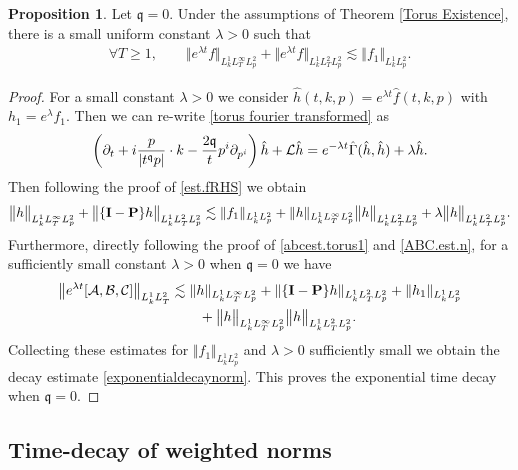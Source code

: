 \documentclass[reqno]{amsart}
\newcommand{\pv}{p}
\def\norm#1{\big\Vert#1\big\Vert}
\newcommand{\qq}{\mathfrak{q}}
\newcommand{\tq}{t^{\qq}}
\newcommand{\linL}{\mathcal{L}}
\newcommand{\micro}{{\bf \{I- P\}}}
\theoremstyle{definition}
\newtheorem{proposition}[theorem]{Proposition}
\numberwithin{equation}{section}
\numberwithin{theorem}{section}
\begin{document}
\begin{proposition}
    Let \(\qq=0\). Under the assumptions of Theorem \ref{Torus Existence}, there is a small uniform constant \(\lambda>0\) such that
    \begin{align}
    \forall T \geq 1,\qquad \norm{e^{\lambda t} f}_{L^1_kL^\infty_TL^2_{\pv}}
+
{\norm{e^{\lambda t} f}_{L^1_kL^2_TL^2_{\pv}}}
\lesssim 
\Vert {f}_1\Vert_{L^1_kL^2_{\pv}}.\label{exponentialdecaynorm}
\end{align}
\end{proposition}

\begin{proof}
For a small constant $\lambda>0$ we consider $\hat{h}(t,k,\pv) = e^{\lambda t} \hat{f}(t,k,\pv)$ with ${h}_1=e^{\lambda}{f}_1$.  Then we can re-write \eqref{torus fourier transformed} as
\begin{align}\notag 
\left(\partial_t  + i\frac{\pv}{|\tq \pv|}\cdot k 
-\frac{2\qq }{t} p^i \partial_{p^i} \right) \hat{h}
+\linL\hat{h}=e^{-\lambda t}\hat{\Gamma}(\hat{h},\hat{h})+ \lambda \hat{h}.
\end{align}
Then following the proof of \eqref{est.fRHS} we obtain
\begin{align*}
    \norm{h}_{L^1_kL^\infty_TL^2_{\pv}}
+
{\norm{\micro h}_{L^1_kL^2_TL^2_{\pv}}}
\lesssim 
\Vert {f}_1\Vert_{L^1_kL^2_{\pv}}
+{\Vert{ h}\Vert_{L^1_kL^\infty_TL^2_{\pv}}} {\norm{ h}_{L^1_kL^2_TL^2_{\pv}}}
+\lambda {\norm{ h}_{L^1_kL^2_TL^2_{\pv}}}.
\end{align*}
Furthermore, directly following the proof of \eqref{abcest.torus1} and \eqref{ABC.est.n}, for a sufficiently small constant $\lambda>0$ when $\qq =0$ we have 
\begin{align}\notag
\norm{ e^{\lambda t} [\mathcal{A},\mathcal{B},\mathcal{C}]}_{L^1_k L^2_T} 
&\lesssim
\Vert h \Vert_{L^1_k L^\infty_T L^2_{\pv}} +
\Vert \micro h \Vert_{L^1_k L^2_T L^2_{\pv}} + \Vert h_1 \Vert_{L^1_k L^2_{\pv}} \\ \notag
&\qquad+ 
    \norm{h}_{L^1_kL^\infty_TL^2_{\pv}} \norm{h}_{L^1_kL^2_TL^2_{\pv}}.
\end{align}
Collecting these estimates for $\Vert {f}_1\Vert_{L^1_kL^2_{\pv}}$ and $\lambda>0$ sufficiently small we obtain the decay estimate \eqref{exponentialdecaynorm}. This proves the exponential time decay when $\qq=0$.
\end{proof}


\subsection{Time-decay of weighted norms}\label{rapid.decay.solution}
\end{document}
